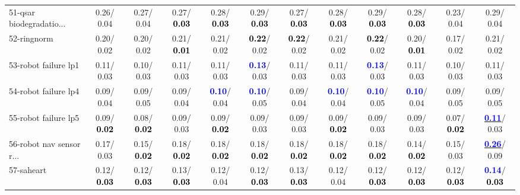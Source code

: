 \begin{table}[h]
\begin{center}
{\begin{tabular}{lc|c|c|c|c|c|c|c|c|c|c}
51-qsar biodegradatio... &   0.26/  0.04 &   0.27/  0.04 &   0.27/\textcolor{black}{\textbf{  0.03}} &   0.28/\textcolor{black}{\textbf{  0.03}} &   0.29/\textcolor{black}{\textbf{  0.03}} &   0.27/\textcolor{black}{\textbf{  0.03}} &   0.28/\textcolor{black}{\textbf{  0.03}} &   0.29/\textcolor{black}{\textbf{  0.03}} &   0.28/\textcolor{black}{\textbf{  0.03}} &   0.23/  0.04 &   0.29/  0.04 \\
52-ringnorm &   0.20/  0.02 &   0.20/  0.02 &   0.21/\textcolor{black}{\textbf{  0.01}} &   0.21/  0.02 & \textcolor{black}{\textbf{  0.22}}/  0.02 & \textcolor{black}{\textbf{  0.22}}/  0.02 &   0.21/  0.02 & \textcolor{black}{\textbf{  0.22}}/  0.02 &   0.20/\textcolor{black}{\textbf{  0.01}} &   0.17/  0.02 &   0.21/  0.02 \\
53-robot failure lp1 &   0.11/  0.03 &   0.10/  0.03 &   0.11/  0.03 &   0.11/  0.03 & \textcolor{blue}{\textbf{  0.13}}/  0.03 &   0.11/  0.03 &   0.11/  0.03 & \textcolor{blue}{\textbf{  0.13}}/  0.03 &   0.11/  0.03 &   0.10/  0.03 &   0.11/  0.03 \\ \hline
54-robot failure lp4 &   0.09/  0.04 &   0.09/  0.05 &   0.09/  0.04 & \textcolor{blue}{\textbf{  0.10}}/  0.04 & \textcolor{blue}{\textbf{  0.10}}/  0.05 &   0.09/  0.04 & \textcolor{blue}{\textbf{  0.10}}/  0.04 & \textcolor{blue}{\textbf{  0.10}}/  0.05 & \textcolor{blue}{\textbf{  0.10}}/  0.04 &   0.09/  0.05 &   0.09/  0.05 \\
55-robot failure lp5 &   0.09/\textcolor{black}{\textbf{  0.02}} &   0.08/\textcolor{black}{\textbf{  0.02}} &   0.09/  0.03 &   0.09/\textcolor{black}{\textbf{  0.02}} &   0.09/  0.03 &   0.09/  0.03 &   0.09/\textcolor{black}{\textbf{  0.02}} &   0.09/  0.03 &   0.09/  0.03 &   0.07/\textcolor{black}{\textbf{  0.02}} & \underline{\textcolor{blue}{\textbf{  0.11}}}/  0.03 \\
56-robot nav sensor r... &   0.17/  0.03 &   0.15/\textcolor{black}{\textbf{  0.02}} &   0.18/\textcolor{black}{\textbf{  0.02}} &   0.18/\textcolor{black}{\textbf{  0.02}} &   0.18/\textcolor{black}{\textbf{  0.02}} &   0.18/\textcolor{black}{\textbf{  0.02}} &   0.18/\textcolor{black}{\textbf{  0.02}} &   0.18/\textcolor{black}{\textbf{  0.02}} &   0.14/\textcolor{black}{\textbf{  0.02}} &   0.15/  0.03 & \underline{\textcolor{blue}{\textbf{  0.26}}}/  0.09 \\
57-saheart &   0.12/\textcolor{black}{\textbf{  0.03}} &   0.12/\textcolor{black}{\textbf{  0.03}} &   0.13/\textcolor{black}{\textbf{  0.03}} &   0.12/  0.04 &   0.12/\textcolor{black}{\textbf{  0.03}} &   0.13/\textcolor{black}{\textbf{  0.03}} &   0.12/  0.04 &   0.12/\textcolor{black}{\textbf{  0.03}} &   0.12/\textcolor{black}{\textbf{  0.03}} &   0.12/\textcolor{black}{\textbf{  0.03}} & \textcolor{blue}{\textbf{  0.14}}/\textcolor{black}{\textbf{  0.03}} \\

\end{tabular}}
\end{center}
\end{table}
